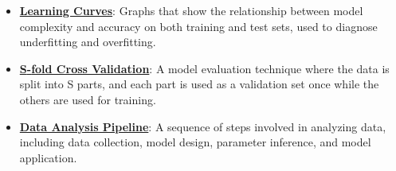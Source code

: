 \documentclass{article}%
\begin{document}
\begin{itemize}[leftmargin=*]
\item \href{https://purdue.brightspace.com/d2l/common/assets/pdfjs-d2l-dist/1.0.14-legacy/web/viewer.html?file=\%2Fcontent\%2Fenforced\%2F1095467-wl.202510.CS.24300.001\%2F10L1-CrossValidation.pdf\%3Fou\%3D1095467\&lang=en-us\&container=d2l-fileviewer-rendered-pdf\&fullscreen=d2l-fileviewer-rendered-pdf-dialog\&height=667#page=20}{\textbf{Learning Curves}}: Graphs that show the relationship between model complexity and accuracy on both training and test sets, used to diagnose underfitting and overfitting.%
\item \href{https://purdue.brightspace.com/d2l/common/assets/pdfjs-d2l-dist/1.0.14-legacy/web/viewer.html?file=\%2Fcontent\%2Fenforced\%2F1095467-wl.202510.CS.24300.001\%2F10L1-CrossValidation.pdf\%3Fou\%3D1095467\&lang=en-us\&container=d2l-fileviewer-rendered-pdf\&fullscreen=d2l-fileviewer-rendered-pdf-dialog\&height=667#page=25}{\textbf{S{-}fold Cross Validation}}: A model evaluation technique where the data is split into S parts, and each part is used as a validation set once while the others are used for training.%
\item \href{https://purdue.brightspace.com/d2l/common/assets/pdfjs-d2l-dist/1.0.14-legacy/web/viewer.html?file=\%2Fcontent\%2Fenforced\%2F1095467-wl.202510.CS.24300.001\%2F10L1-CrossValidation.pdf\%3Fou\%3D1095467\&lang=en-us\&container=d2l-fileviewer-rendered-pdf\&fullscreen=d2l-fileviewer-rendered-pdf-dialog\&height=667#page=26}{\textbf{Data Analysis Pipeline}}: A sequence of steps involved in analyzing data, including data collection, model design, parameter inference, and model application.%
\end{itemize}%
\end{document}

